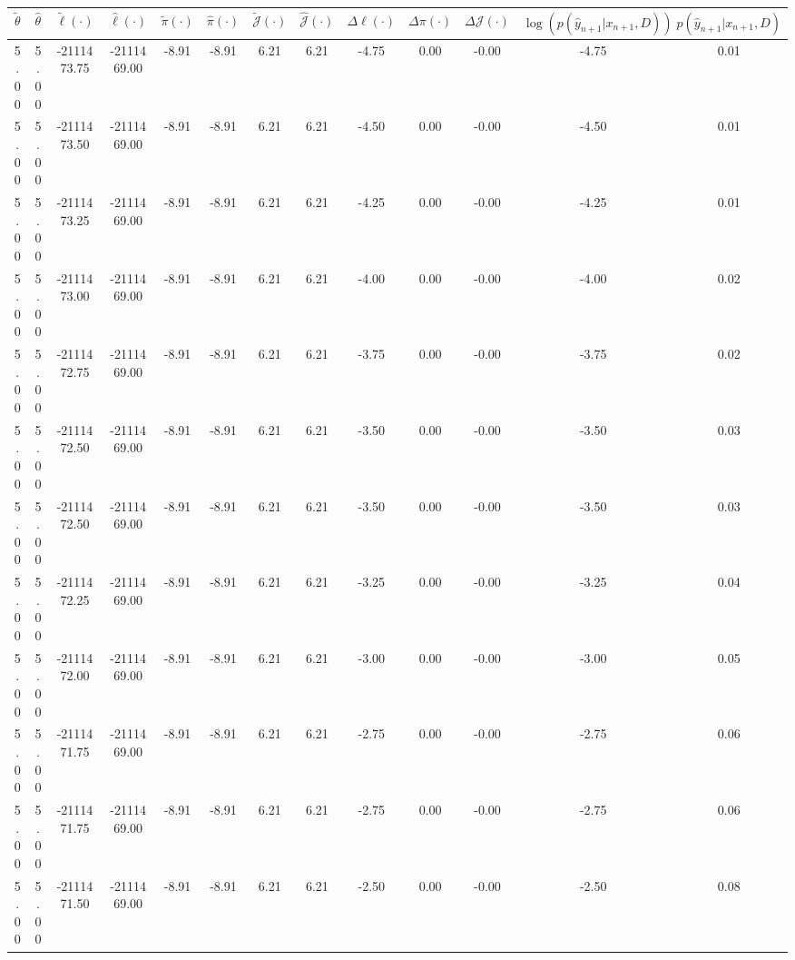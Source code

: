 \begin{table}[htbp]
        \centering
        \tiny
        \begin{adjustbox}{angle=90}
            \begin{tabular}{|c|c|c|c|c|c|c|c|c|c|c|c|c|}
                \hline
                 $\tilde{\theta}$ & $\hat{\theta}$ & $\tilde{\ell}(\cdot)$ & $\hat{\ell}(\cdot)$ & $\tilde{\pi}(\cdot)$ & $\hat{\pi}(\cdot)$ & $\tilde{\mathcal{J}}(\cdot)$ & $\hat{\mathcal{J}}(\cdot)$ & $\Delta \ell(\cdot)$ & $\Delta \pi(\cdot)$ & $\Delta \mathcal{J}(\cdot)$ & $\log(p(\hat{y}_{n+1}|x_{n+1}, D))$ & $p(\hat{y}_{n+1}|x_{n+1}, D)$ \\
                \hline
                 5.00 & 5.00 & -2111473.75 & -2111469.00 & -8.91 & -8.91 & 6.21 & 6.21 & -4.75 & 0.00 & -0.00 & -4.75 & 0.01\\ \hline
 5.00 & 5.00 & -2111473.50 & -2111469.00 & -8.91 & -8.91 & 6.21 & 6.21 & -4.50 & 0.00 & -0.00 & -4.50 & 0.01\\ \hline
 5.00 & 5.00 & -2111473.25 & -2111469.00 & -8.91 & -8.91 & 6.21 & 6.21 & -4.25 & 0.00 & -0.00 & -4.25 & 0.01\\ \hline
 5.00 & 5.00 & -2111473.00 & -2111469.00 & -8.91 & -8.91 & 6.21 & 6.21 & -4.00 & 0.00 & -0.00 & -4.00 & 0.02\\ \hline
 5.00 & 5.00 & -2111472.75 & -2111469.00 & -8.91 & -8.91 & 6.21 & 6.21 & -3.75 & 0.00 & -0.00 & -3.75 & 0.02\\ \hline
 5.00 & 5.00 & -2111472.50 & -2111469.00 & -8.91 & -8.91 & 6.21 & 6.21 & -3.50 & 0.00 & -0.00 & -3.50 & 0.03\\ \hline
 5.00 & 5.00 & -2111472.50 & -2111469.00 & -8.91 & -8.91 & 6.21 & 6.21 & -3.50 & 0.00 & -0.00 & -3.50 & 0.03\\ \hline
 5.00 & 5.00 & -2111472.25 & -2111469.00 & -8.91 & -8.91 & 6.21 & 6.21 & -3.25 & 0.00 & -0.00 & -3.25 & 0.04\\ \hline
 5.00 & 5.00 & -2111472.00 & -2111469.00 & -8.91 & -8.91 & 6.21 & 6.21 & -3.00 & 0.00 & -0.00 & -3.00 & 0.05\\ \hline
 5.00 & 5.00 & -2111471.75 & -2111469.00 & -8.91 & -8.91 & 6.21 & 6.21 & -2.75 & 0.00 & -0.00 & -2.75 & 0.06\\ \hline
 5.00 & 5.00 & -2111471.75 & -2111469.00 & -8.91 & -8.91 & 6.21 & 6.21 & -2.75 & 0.00 & -0.00 & -2.75 & 0.06\\ \hline
 5.00 & 5.00 & -2111471.50 & -2111469.00 & -8.91 & -8.91 & 6.21 & 6.21 & -2.50 & 0.00 & -0.00 & -2.50 & 0.08\\ \hline

\end{tabular}
\end{adjustbox}
\end{table}
